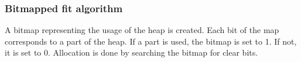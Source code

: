 \subsubsection{Bitmapped fit algorithm}
A bitmap representing the usage of the heap is created.
Each bit of the map corresponds to a part of the heap.
If a part is used, the bitmap is set to 1.
If not, it is set to 0.
Allocation is done by searching the bitmap for clear bits.


